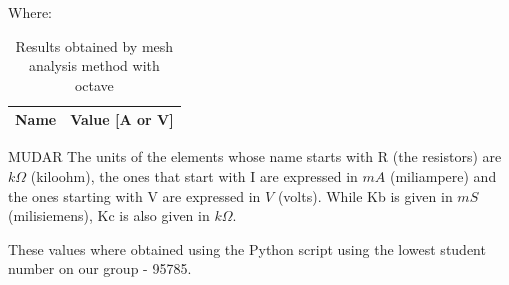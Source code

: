 Where:
\begin{center}
\begin{table}[H]
 \centering
  \begin{tabular}{|c|c|}
    \hline    
    {\bf Name} & {\bf Value [A or V]} \\ \hline
    
  \end{tabular}
  \caption{Results obtained by mesh analysis method with octave}
  \label{tab:mesh}
\end{table}
\end{center}

MUDAR The units of the elements whose name starts with R (the resistors) are $k\Omega$ (kiloohm), the ones that start with I are expressed in $mA$ (miliampere) and the ones starting with V are expressed in $V$ (volts). While Kb is given in $mS$ (milisiemens), Kc is also given in $k\Omega$.

These values where obtained using the Python script using the lowest student number on our group - 95785.


